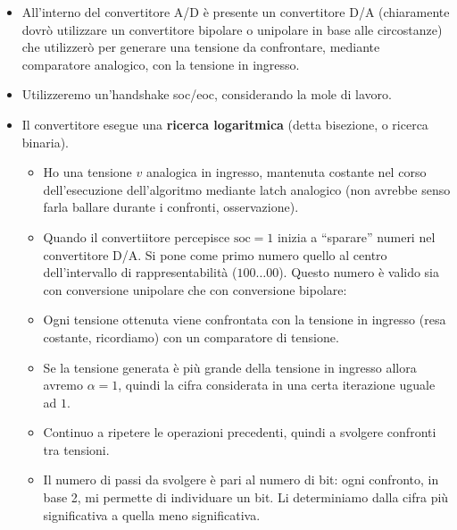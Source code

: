 \documentclass[11pt]{report}
\begin{document}
\begin{itemize}
\item All'interno del convertitore A/D è presente un convertitore D/A (chiaramente dovrò utilizzare un convertitore bipolare o unipolare in base alle circostanze) che utilizzerò per generare una tensione da confrontare, mediante comparatore analogico, con la tensione in ingresso.
\item Utilizzeremo un'handshake soc/eoc, considerando la mole di lavoro.
\item Il convertitore esegue una \textbf{ricerca logaritmica} (detta bisezione, o ricerca binaria).
\begin{itemize}
\item Ho una tensione $v$ analogica in ingresso, mantenuta costante nel corso dell'esecuzione dell'algoritmo mediante latch analogico (non avrebbe senso farla ballare durante i confronti, osservazione).
\item Quando il convertiitore percepisce $\text{soc}=1$ inizia a ``sparare'' numeri nel convertitore D/A. Si pone come primo numero quello al centro dell'intervallo di rappresentabilità ($100 \dots 00$). Questo numero è valido sia con conversione unipolare che con conversione bipolare: 
\item Ogni tensione ottenuta viene confrontata con la tensione in ingresso (resa costante, ricordiamo) con un comparatore di tensione.
\item Se la tensione generata è più grande della tensione in ingresso allora avremo $\alpha=1$, quindi la cifra considerata in una certa iterazione uguale ad $1$. 
\item Continuo a ripetere le operazioni precedenti, quindi a svolgere confronti tra tensioni.
\item Il numero di passi da svolgere è pari al numero di bit: ogni confronto, in base 2, mi permette di individuare un bit. Li determiniamo dalla cifra più significativa a quella meno significativa.
\end{itemize}
\end{itemize}
\end{document}
